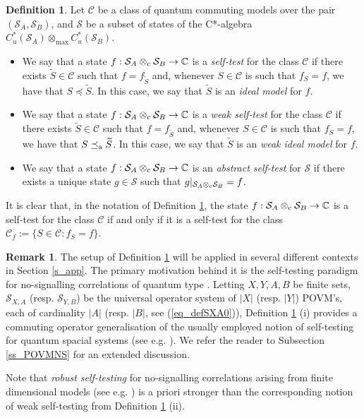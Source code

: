 \documentclass[11pt]{amsart}
\theoremstyle{definition}
\newtheorem{defn}[theorem]{Definition}
\newtheorem{remark}[theorem]{Remark}
\newcommand{\cl}[1]{\mathcal{#1}}
\newcommand{\bb}[1]{\mathbb{#1}}
\providecommand{\wt}[1]{\widetilde{#1}}
\begin{document}
\begin{defn}\label{d_st}
Let $\cl C$ be a class of quantum commuting models
over the pair $(\cl S_A,\cl S_B)$, and 
$\cl S$ be a subset of states of the C*-algebra
$C_u^*(\cl S_A)\otimes_{\max}C_u^*(\cl S_B)$.

\begin{itemize}
\item[(i)]
We say that a state 
$f : \cl S_A\otimes_{\rm c} \cl S_B\to\mathbb C$ is a 
\emph{self-test} for the class $\cl C$ if there exists
$\wt{S}\in\cl C$ such that $f=f_{\wt{S}}$ and, 
whenever $S\in\cl C$ is such that $f_S = f$, we have that 
$S\preceq \wt{S}$. 
In this case, we say that $\wt{S}$ is an \emph{ideal model} for $f$. 


\item[(ii)]
We say that a state 
$f : \cl S_A\otimes_{\rm c} \cl S_B\to\mathbb C$ is a 
\emph{weak self-test} for the class $\cl C$ if there exists
$\wt{S}\in\cl C$ such that $f=f_{\wt{S}}$ and, 
whenever $S\in\cl C$ is such that $f_S = f$, we have that 
$S\preceq_{\rm a} \wt{S}$. 
In this case, we say that $\wt{S}$ is an \emph{weak ideal model} for $f$.

\item[(iii)]
We say that a state $f : \cl S_A\otimes_{\rm c}\cl S_B\to\mathbb C$ is 
an \emph{abstract self-test} for $\cl S$ 
if there exists a unique state $g\in \cl S$ such that 
$g|_{\cl S_A\otimes_{\rm c}\cl S_B} = f$.
\end{itemize}
\end{defn}


It is clear that, in the notation of Definition \ref{d_st},  
the state $f : \cl S_A\otimes_{\rm c} \cl S_B\to\bb{C}$ is a 
self-test for the class $\cl C$ if and only if 
it is a self-test for the class 
$\cl C_f := \{S\in \cl C : f_S = f\}$.



\begin{remark} 
The setup of Definition \ref{d_st} will be applied in 
several different contexts in Section \ref{s_app}. 
The primary motivation behind it is the 
self-testing paradigm for no-signalling correlations of quantum type \cite{mps, pszz}. 
Letting $X,Y,A,B$ be finite sets, 
$\cl{S}_{X,A}$ (resp. $\cl S_{Y,B}$) 
be the universal operator system of $|X|$ (resp. $|Y|$) 
POVM's, each of cardinality $|A|$ (resp. $|B|$, see (\ref{eq_defSXA0})), Definition \ref{d_st} (i) provides a commuting operator generalisation of the 
usually employed notion of self-testing for quantum spacial systems (see e.g. \cite{supic-bowles}). We refer the reader to Subsection \ref{ss_POVMNS} for an extended discussion.

Note that \emph{robust self-testing} for 
no-signalling correlations arising from finite dimensional 
models (see e.g. \cite[Definition 3.3]{zhao}) is a priori stronger than 
the corresponding notion of 
weak self-testing from Definition \ref{d_st} (ii).
\end{remark}
\end{document}
